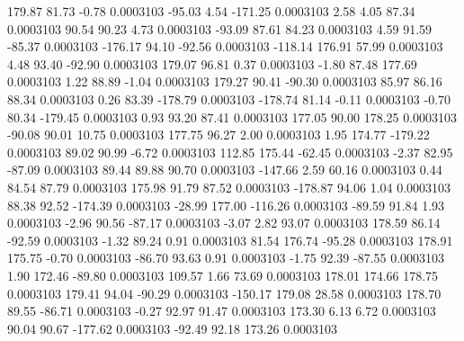       179.87       81.73       -0.78     0.0003103
      -95.03        4.54     -171.25     0.0003103
        2.58        4.05       87.34     0.0003103
       90.54       90.23        4.73     0.0003103
      -93.09       87.61       84.23     0.0003103
        4.59       91.59      -85.37     0.0003103
     -176.17       94.10      -92.56     0.0003103
     -118.14      176.91       57.99     0.0003103
        4.48       93.40      -92.90     0.0003103
      179.07       96.81        0.37     0.0003103
       -1.80       87.48      177.69     0.0003103
        1.22       88.89       -1.04     0.0003103
      179.27       90.41      -90.30     0.0003103
       85.97       86.16       88.34     0.0003103
        0.26       83.39     -178.79     0.0003103
     -178.74       81.14       -0.11     0.0003103
       -0.70       80.34     -179.45     0.0003103
        0.93       93.20       87.41     0.0003103
      177.05       90.00      178.25     0.0003103
      -90.08       90.01       10.75     0.0003103
      177.75       96.27        2.00     0.0003103
        1.95      174.77     -179.22     0.0003103
       89.02       90.99       -6.72     0.0003103
      112.85      175.44      -62.45     0.0003103
       -2.37       82.95      -87.09     0.0003103
       89.44       89.88       90.70     0.0003103
     -147.66        2.59       60.16     0.0003103
        0.44       84.54       87.79     0.0003103
      175.98       91.79       87.52     0.0003103
     -178.87       94.06        1.04     0.0003103
       88.38       92.52     -174.39     0.0003103
      -28.99      177.00     -116.26     0.0003103
      -89.59       91.84        1.93     0.0003103
       -2.96       90.56      -87.17     0.0003103
       -3.07        2.82       93.07     0.0003103
      178.59       86.14      -92.59     0.0003103
       -1.32       89.24        0.91     0.0003103
       81.54      176.74      -95.28     0.0003103
      178.91      175.75       -0.70     0.0003103
      -86.70       93.63        0.91     0.0003103
       -1.75       92.39      -87.55     0.0003103
        1.90      172.46      -89.80     0.0003103
      109.57        1.66       73.69     0.0003103
      178.01      174.66      178.75     0.0003103
      179.41       94.04      -90.29     0.0003103
     -150.17      179.08       28.58     0.0003103
      178.70       89.55      -86.71     0.0003103
       -0.27       92.97       91.47     0.0003103
      173.30        6.13        6.72     0.0003103
       90.04       90.67     -177.62     0.0003103
      -92.49       92.18      173.26     0.0003103
